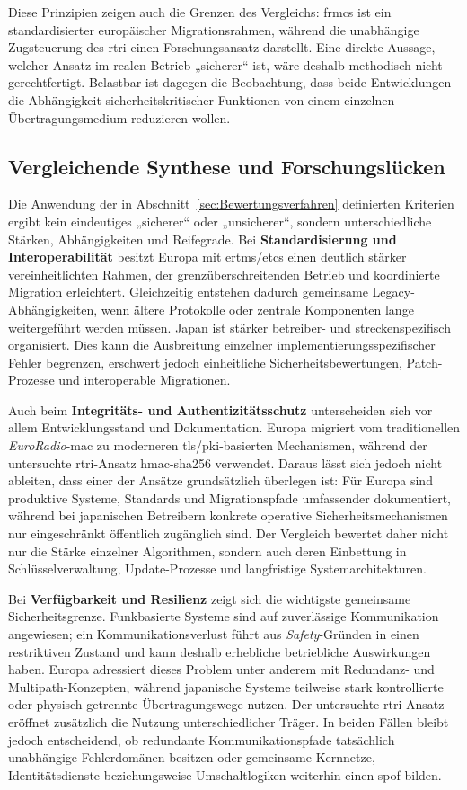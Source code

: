 \documentclass[runningheads]{res/llncs}
\begin{document}
Diese Prinzipien zeigen auch die Grenzen des Vergleichs: \gls{frmcs} ist ein standardisierter europäischer Migrationsrahmen, während die unabhängige Zugsteuerung des \gls{rtri} einen Forschungsansatz darstellt. Eine direkte Aussage, welcher Ansatz im realen Betrieb „sicherer“ ist, wäre deshalb methodisch nicht gerechtfertigt. Belastbar ist dagegen die Beobachtung, dass beide Entwicklungen die Abhängigkeit sicherheitskritischer Funktionen von einem einzelnen Übertragungsmedium reduzieren wollen.

\subsection{Vergleichende Synthese und Forschungslücken}
\label{sec:Vergleichende_Synthese}
Die Anwendung der in Abschnitt~\ref{sec:Bewertungsverfahren} definierten Kriterien ergibt kein eindeutiges „sicherer“ oder „unsicherer“, sondern unterschiedliche Stärken, Abhängigkeiten und Reifegrade. Bei \textbf{Standardisierung und Interoperabilität} besitzt Europa mit \gls{ertms}/\gls{etcs} einen deutlich stärker vereinheitlichten Rahmen, der grenzüberschreitenden Betrieb und koordinierte Migration erleichtert. Gleichzeitig entstehen dadurch gemeinsame Legacy-Abhängigkeiten, wenn ältere Protokolle oder zentrale Komponenten lange weitergeführt werden müssen. Japan ist stärker betreiber- und streckenspezifisch organisiert. Dies kann die Ausbreitung einzelner implementierungsspezifischer Fehler begrenzen, erschwert jedoch einheitliche Sicherheitsbewertungen, Patch-Prozesse und interoperable Migrationen.

Auch beim \textbf{Integritäts- und Authentizitätsschutz} unterscheiden sich vor allem Entwicklungsstand und Dokumentation. Europa migriert vom traditionellen \textit{EuroRadio}-\gls{mac} zu moderneren \gls{tls}/\gls{pki}-basierten Mechanismen, während der untersuchte \gls{rtri}-Ansatz \gls{hmac-sha256} verwendet. Daraus lässt sich jedoch nicht ableiten, dass einer der Ansätze grundsätzlich überlegen ist: Für Europa sind produktive Systeme, Standards und Migrationspfade umfassender dokumentiert, während bei japanischen Betreibern konkrete operative Sicherheitsmechanismen nur eingeschränkt öffentlich zugänglich sind. Der Vergleich bewertet daher nicht nur die Stärke einzelner Algorithmen, sondern auch deren Einbettung in Schlüsselverwaltung, Update-Prozesse und langfristige Systemarchitekturen.

Bei \textbf{Verfügbarkeit und Resilienz} zeigt sich die wichtigste gemeinsame Sicherheitsgrenze. Funkbasierte Systeme sind auf zuverlässige Kommunikation angewiesen; ein Kommunikationsverlust führt aus \textit{Safety}-Gründen in einen restriktiven Zustand und kann deshalb erhebliche betriebliche Auswirkungen haben. Europa adressiert dieses Problem unter anderem mit Redundanz- und Multipath-Konzepten, während japanische Systeme teilweise stark kontrollierte oder physisch getrennte Übertragungswege nutzen. Der untersuchte \gls{rtri}-Ansatz eröffnet zusätzlich die Nutzung unterschiedlicher Träger. In beiden Fällen bleibt jedoch entscheidend, ob redundante Kommunikationspfade tatsächlich unabhängige Fehlerdomänen besitzen oder gemeinsame Kernnetze, Identitätsdienste beziehungsweise Umschaltlogiken weiterhin einen \gls{spof} bilden.
\end{document}

